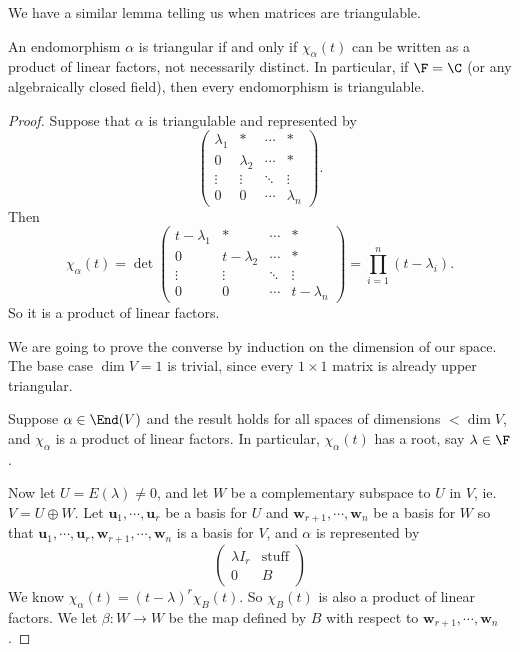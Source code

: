 \documentclass[a4paper]{article}
\begin{document}
We have a similar lemma telling us when matrices are triangulable.

\begin{lemma}
  An endomorphism $\alpha$ is triangular if and only if $\chi_\alpha(t)$ can be written as a product of linear factors, not necessarily distinct. In particular, if $\F = \C$ (or any algebraically closed field), then every endomorphism is triangulable.
\end{lemma}

\begin{proof}
  Suppose that $\alpha$ is triangulable and represented by
  \[
    \begin{pmatrix}
      \lambda_1 & * & \cdots & *\\
      0 & \lambda_2 & \cdots & *\\
      \vdots & \vdots & \ddots & \vdots\\
      0 & 0 & \cdots & \lambda_n
    \end{pmatrix}.
  \]
  Then
  \[
    \chi_\alpha(t) = \det
    \begin{pmatrix}
      t - \lambda_1 & * & \cdots & *\\
      0 & t - \lambda_2 & \cdots & *\\
      \vdots & \vdots & \ddots & \vdots\\
      0 & 0 & \cdots & t - \lambda_n
    \end{pmatrix} =
    \prod_{i = 1}^n (t - \lambda_i).
  \]
  So it is a product of linear factors.

  We are going to prove the converse by induction on the dimension of our space. The base case $\dim V = 1$ is trivial, since every $1\times 1$ matrix is already upper triangular.

  Suppose $\alpha \in \End(V)$ and the result holds for all spaces of dimensions $< \dim V$, and $\chi_\alpha$ is a product of linear factors. In particular, $\chi_\alpha(t)$ has a root, say $\lambda \in \F$.

  Now let $U = E(\lambda) \not= 0$, and let $W$ be a complementary subspace to $U$ in $V$, ie. $V = U \oplus W$. Let $\mathbf{u}_1, \cdots, \mathbf{u}_r$ be a basis for $U$ and $\mathbf{w}_{r + 1}, \cdots, \mathbf{w}_n$ be a basis for $W$ so that $\mathbf{u}_1, \cdots, \mathbf{u}_{r}, \mathbf{w}_{r + 1}, \cdots, \mathbf{w}_n$ is a basis for $V$, and $\alpha$ is represented by
  \[
    \begin{pmatrix}
      \lambda I_r & \text{stuff}\\
      0 & B
    \end{pmatrix}
  \]
  We know $\chi_\alpha(t) = (t - \lambda)^r \chi_B(t)$. So $\chi_B(t)$ is also a product of linear factors. We let $\beta: W\to W$ be the map defined by $B$ with respect to $\mathbf{w}_{r + 1}, \cdots, \mathbf{w}_n$.


\end{proof}
\end{document}
